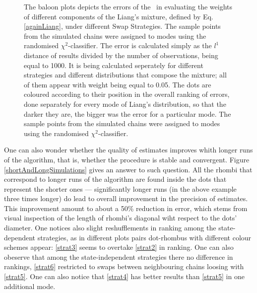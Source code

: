 \begin{figure}[ht]
{		The baloon plots depicts the errors of the \PT\, in evaluating the weights of different components of the Liang's mixture, defined by Eq. \ref{againLiang}, under different Swap Strategies. The sample points from the simulated chains were assigned to modes using the randomised $\chi^2$-classifier. The error is calculated simply as the $l^1$ distance of results divided by the number of observations, being equal to 1000. It is being calculated seperately for different strategies and different distributions that compose the mixture; all of them appear with weight being equal to 0.05. The dots are coloured according to their position in the overall ranking of errors, done separately for every mode of Liang's distribution, so that the darker they are, the bigger was the error for a particular mode. The sample points from the simulated chains were assigned to modes using the randomised $\chi^2$-classifier.   
	}\label{AAE}
\end{figure}

One can also wonder whether the quality of estimates improves whith longer runs of the algorithm, that is, whether the procedure is stable and convergent. Figure \ref{shortAndLongSimulations} gives an answer to such question. All the rhombi that correspond to longer runs of the algorithm are found inside the dots that represent the shorter ones --- significantly longer runs (in the above example three times longer) do lead to overall improvement in the precision of estimates. This improvement amount to about a 50\% reduction in error, which stems from visual inspection of the length of rhombi's diagonal wiht respect to the dots' diameter. One notices also slight reshufflements in ranking among the state-dependent strategies, as in different plots pairs dot-rhombus with different colour schemes appear: \ref{strat3} seems to overtake \ref{strat2} in ranking. One can also obeserve that among the state-independent strategies there no difference in rankings, \ref{strat6} restricted to swaps between neighbouring chains loosing with \ref{strat5}. One can also notice that \ref{strat4} has better results than \ref{strat5} in one additional mode. 

